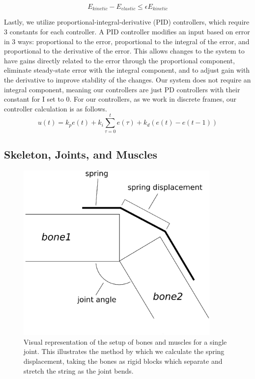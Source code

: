 \[
	E_{kinetic} - E_{elastic} \le \epsilon E_{kinetic}
\]

Lastly, we utilize proportional-integral-derivative (PID) controllers, which require 3 constants for each controller.  A PID controller modifies an input based on error in 3 ways: proportional to the error, proportional to the integral of the error, and proportional to the derivative of the error.  This allows changes to the system to have gains directly related to the error through the proportional component, eliminate steady-state error with the integral component, and to adjust gain with the derivative to improve stability of the changes.  Our system does not require an integral component, meaning our controllers are just PD controllers with their constant for I set to 0.  For our controllers, as we work in discrete frames, our controller calculation is as follows.
\[
	u(t) = k_p e(t) + k_i \displaystyle\sum_{\tau = 0}^t e(\tau) + k_d \left( e(t) - e(t-1) \right)
\]


\subsection{Skeleton, Joints, and Muscles}
\label{subsection:skel_joints}

\begin{figure}[ht]
	\centering
	\includegraphics[width=10cm]{images/spring_calc/spring_angle_calc.eps}
	\caption[Diagram of muscle setup]{Visual representation of the setup of bones and muscles for a single joint.  This illustrates the method by which we calculate the spring displacement, taking the bones as rigid blocks which separate and stretch the string as the joint bends.}
	\label{fig:forceCalc}
\end{figure}

